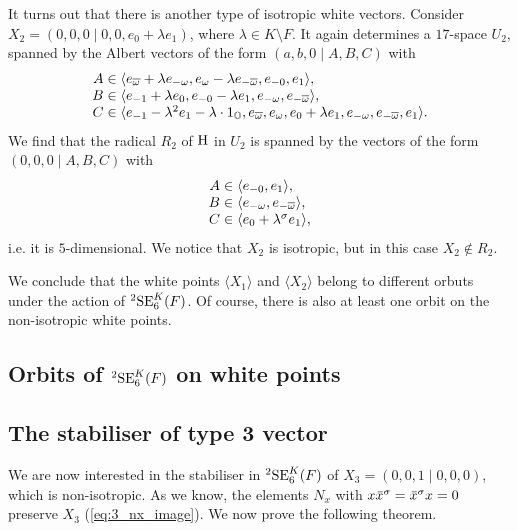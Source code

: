 It turns out that there is another type of isotropic white vectors. Consider 
$X_2 = (0,0,0 \mid 0,0,e_0 + \lambda e_1)$, where $\lambda \in K\setminus F$. It again determines a 
$17$-space $U_2$, spanned by the Albert vectors of the form $(a,b,0\mid A,B,C)$ with 
\begin{equation}
	\begin{array}{r@{\;}c@{\;}l}
		A & \in & \langle e_{\bar{\omega}}+\lambda e_{-\omega}, e_{\omega}-\lambda e_{-\bar{\omega}}
		, e_{-0}, e_1
		\rangle, \\
		B & \in & \langle e_{-1}+\lambda e_0, e_{-0} - \lambda e_1,
	e_{-\omega}, e_{-\bar{\omega}}  \rangle, \\
		C & \in & \langle e_{-1}-\lambda^2 e_1 - \lambda \cdot 1_{\O}, e_{\bar{\omega}}, e_{\omega},
	e_0 + \lambda e_1, e_{-\omega}, e_{-\bar{\omega}}, e_1 \rangle.
	\end{array}
\end{equation}
We find that the radical $R_2$ of $\mathrm{H}$ in $U_2$ is spanned by the vectors of the form 
$(0,0,0\mid A,B,C)$ with 
\begin{equation}
	\begin{array}{r@{\;}c@{\;}l}
		A & \in & \langle e_{-0}, e_1 \rangle, \\
		B & \in & \langle e_{-\omega}, e_{-\bar{\omega}} \rangle, \\
		C & \in & \langle e_0 + \lambda^{\s} e_1 \rangle,
	\end{array}
\end{equation}
i.e. it is $5$-dimensional. We notice that $X_2$ is isotropic, but in this case $X_2 \not\in R_2$.

We conclude that the white points $\langle X_1 \rangle$ and $\langle X_2 \rangle$ belong to different
orbuts under the action of ${}^2\mathrm{SE}_6^K(F)$. Of course, there is also at least one orbit on the 
non-isotropic white points. 

\subsection{Orbits of ${}^2\mathrm{SE}_6^K(F)$ on white points}

\subsection{The stabiliser of type 3 vector}

We are now interested in the stabiliser in ${}^2\mathrm{SE}_6^K(F)$ of 
$X_3 = (0,0,1\mid 0,0,0)$, which is non-isotropic. As we know, the elements
$N_x$ with $x\ovx^{\s} = \ovx^{\s}x = 0$ preserve $X_3$ (\ref{eq:3_nx_image}).
We now prove the following theorem.

